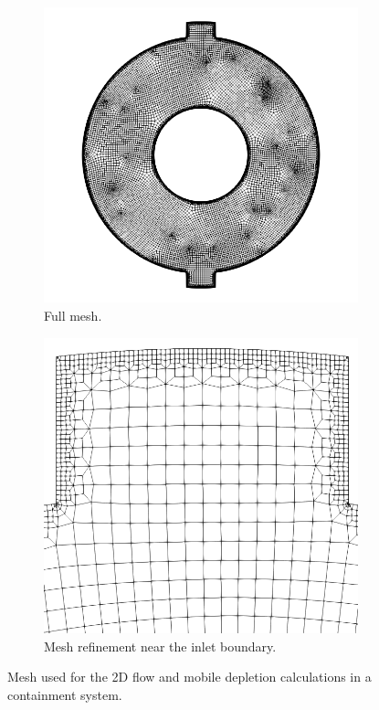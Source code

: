 \begin{figure}[H]
    \centering
    \begin{subfigure}[b]{0.495\textwidth}
        \centering
        \includegraphics[width=\textwidth]{images/demos/bwr_shield/flow_mesh.png}
        \caption{Full mesh.}
        \label{fig:demo:bwr:mesh:flow_full}
    \end{subfigure}
    \hfill
    \begin{subfigure}[b]{0.495\textwidth}
        \centering
        \includegraphics[width=\textwidth]{images/demos/bwr_shield/flow_mesh_close.png}
        \caption{Mesh refinement near the inlet boundary.}
        \label{fig:demo:bwr:mesh:flow_bnd}
    \end{subfigure}
    \caption{Mesh used for the 2D flow and mobile depletion calculations in a containment system.}
    \label{fig:demo:bwr:flow_mesh}
\end{figure}

